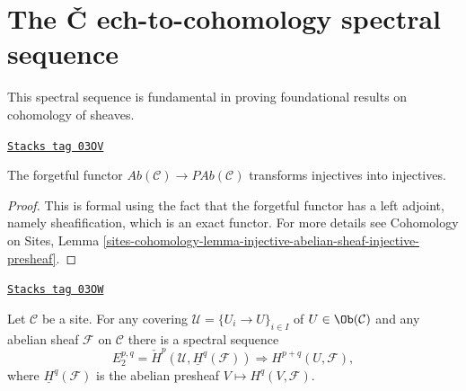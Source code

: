 \section{The {\v C}
ech-to-cohomology spectral sequence}
\label{etale-cohomology-section-cech-ss}

This spectral sequence is fundamental in proving foundational results on
cohomology of sheaves.

\begin{lemma}
\label{etale-cohomology-lemma-forget-injectives}
\href{https://stacks.math.columbia.edu/tag/03OV}{\texttt{Stacks tag 03OV}}

The forgetful functor $\textit{Ab}(\mathcal{C})\to \textit{PAb}(\mathcal{C})$
transforms injectives into injectives.
\end{lemma}

\begin{proof}
This is formal using the fact that the forgetful functor has a left adjoint,
namely sheafification, which is an exact functor. For more details see
Cohomology on Sites,
Lemma \ref{sites-cohomology-lemma-injective-abelian-sheaf-injective-presheaf}.
\end{proof}

\begin{theorem}[Cech ss]
\label{etale-cohomology-theorem-cech-ss}
\href{https://stacks.math.columbia.edu/tag/03OW}{\texttt{Stacks tag 03OW}}

Let $\mathcal{C}$ be a site. For any covering
$\mathcal{U} = \{U_i \to U\}_{i \in I}$ of $U \in \Ob(\mathcal{C})$
and any abelian sheaf $\mathcal{F}$ on $\mathcal{C}$
there is a spectral sequence
$$
E_2^{p, q}
=
\check H^p(\mathcal{U}, \underline{H}^q(\mathcal{F}))
\Rightarrow
H^{p+q}(U, \mathcal{F}),
$$
where $\underline{H}^q(\mathcal{F})$ is the abelian presheaf
$V \mapsto H^q(V, \mathcal{F})$.
\end{theorem}

